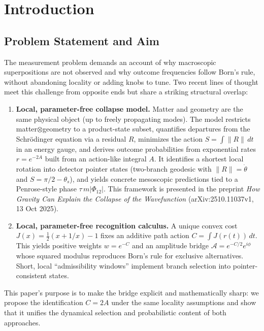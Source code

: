 \documentclass[11pt,letterpaper]{article}
\begin{document}
\section{Introduction}

\subsection{Problem Statement and Aim}

The measurement problem demands an account of why macroscopic superpositions are not observed and why outcome frequencies follow Born's rule, without abandoning locality or adding knobs to tune. Two recent lines of thought meet this challenge from opposite ends but share a striking structural overlap:

\begin{enumerate}[leftmargin=*, label=\roman*., itemsep=0.5em]
\item \textbf{Local, parameter-free collapse model.} Matter and geometry are the same physical object (up to freely propagating modes). The model restricts matter$\otimes$geometry to a product-state subset, quantifies departures from the Schrödinger equation via a residual $R$, minimizes the action $S=\int\!\|R\|\,dt$ in an energy gauge, and derives outcome probabilities from exponential rates $r=e^{-2A}$ built from an action-like integral $A$. It identifies a shortest local rotation into detector pointer states (two-branch geodesic with $\|R\|=\dot{\theta}$ and $S=\pi/2-\theta_s$), and yields concrete mesoscopic predictions tied to a Penrose-style phase $\tau\,m|\Phi_{12}|$. This framework is presented in the preprint \emph{How Gravity Can Explain the Collapse of the Wavefunction} (arXiv:2510.11037v1, 13 Oct 2025).

\item \textbf{Local, parameter-free recognition calculus.} A unique convex cost $J(x)=\frac{1}{2}(x+1/x)-1$ fixes an additive path action $C=\int J(r(t))\,dt$. This yields positive weights $w=e^{-C}$ and an amplitude bridge $\mathcal{A}=e^{-C/2}e^{i\phi}$ whose squared modulus reproduces Born's rule for exclusive alternatives. Short, local ``admissibility windows'' implement branch selection into pointer-consistent states.
\end{enumerate}

This paper's purpose is to make the bridge explicit and mathematically sharp: we propose the identification $C=2A$ under the same locality assumptions and show that it unifies the dynamical selection and probabilistic content of both approaches.
\end{document}
